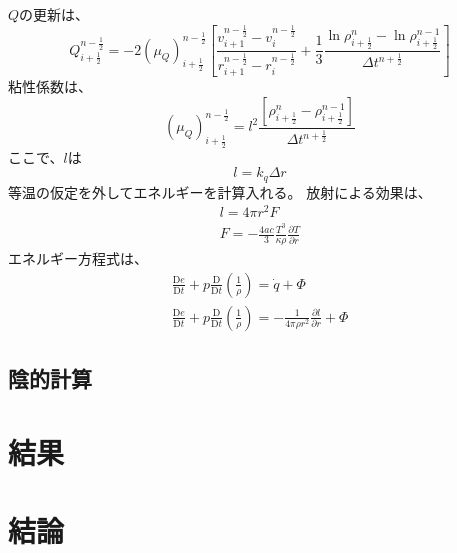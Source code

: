 \documentclass{jsarticle}
\newcommand{\pder}[2][]{\frac{\partial#1}{\partial#2}}
\newcommand{\Dder}[2][]{\frac{\mathrm{D}#1}{\mathrm{D}#2}}
\newcommand{\half}{\frac{1}{2}}
\newcommand{\hpn}{n + \half}
\newcommand{\hmn}{n - \half}
\newcommand{\hpi}{i + \half}
\newcommand{\beq}{\begin{equation}}
\newcommand{\eeq}{\end{equation}}
\begin{document}
$Q$の更新は、
\beq
    Q^{\hmn}_{\hpi} = - 2 (\mu_Q)^{\hmn}_{\hpi}
     \left[\frac{v^{\hmn}_{i+1}-v^{\hmn}_{i}}{r^{\hmn}_{i+1}-r^{\hmn}_{i}}
      +\frac{1}{3}\frac{\ln \rho^{n}_{\hpi} - \ln \rho^{n-1}_{\hpi}}{\Delta t^{\hpn}}\right]
\eeq
粘性係数は、
\beq
    (\mu_Q)^{n-\half}_{i+\half} = 
    l^2 \frac{\left[ \rho^n_{\hpi} - \rho^{n-1}_{\hpi}\right]}{\Delta t^{\hpn}}
\eeq
ここで、$l$は
\beq
    l = k_q \Delta r
\eeq
等温の仮定を外してエネルギーを計算入れる。
放射による効果は、
\begin{align}
        l = 4\pi r^2 F\\
            F = - \frac{4ac}{3} \frac{T^3}{\kappa \rho}\pder[T]{r}
        \end{align}
        エネルギー方程式は、
        \begin{align}
                \Dder[e]{t} + p \Dder[]{t}(\frac{1}{\rho}) = \dot{q} + \Phi\\
                    \Dder[e]{t} + p \Dder[]{t}(\frac{1}{\rho}) = - \frac{1}{4\pi\rho r^2}\pder[l]{r} + \Phi
                \end{align}    
\subsection{陰的計算}
\section{結果}
\section{結論}


\end{document}

